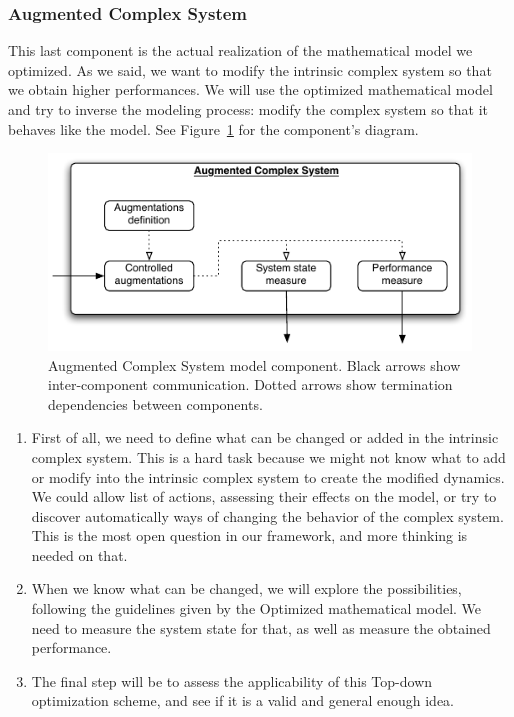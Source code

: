 \documentclass[letterpaper, oneside]{article}
\begin{document}
\subsubsection{Augmented Complex System} %
\label{ssub:augmented_complex_system}

This last component is the actual realization of the mathematical model we optimized. As we said, we want to modify the intrinsic complex system so that we obtain higher performances. We will use the optimized mathematical model and try to inverse the modeling process: modify the complex system so that it behaves like the model. See Figure~\ref{fig:img_augmented_complex_system} for the component's diagram.

\begin{figure}[h!]
	\centering
		\includegraphics[width=12cm]{img/augmented_complex_system.pdf}
	\caption{Augmented Complex System model component. Black arrows show inter-component communication. Dotted arrows show termination dependencies between components.}
	\label{fig:img_augmented_complex_system}
\end{figure}

\begin{enumerate}
	\item First of all, we need to define what can be changed or added in the intrinsic complex system. This is a hard task because we might not know what to add or modify into the intrinsic complex system to create the modified dynamics. We could allow list of actions, assessing their effects on the model, or try to discover automatically ways of changing the behavior of the complex system. This is the most open question in our framework, and more thinking is needed on that.
	\item When we know what can be changed, we will explore the possibilities, following the guidelines given by the Optimized mathematical model. We need to measure the system state for that, as well as measure the obtained performance.
	\item The final step will be to assess the applicability of this Top-down optimization scheme, and see if it is a valid and general enough idea.
\end{enumerate}
\end{document}
